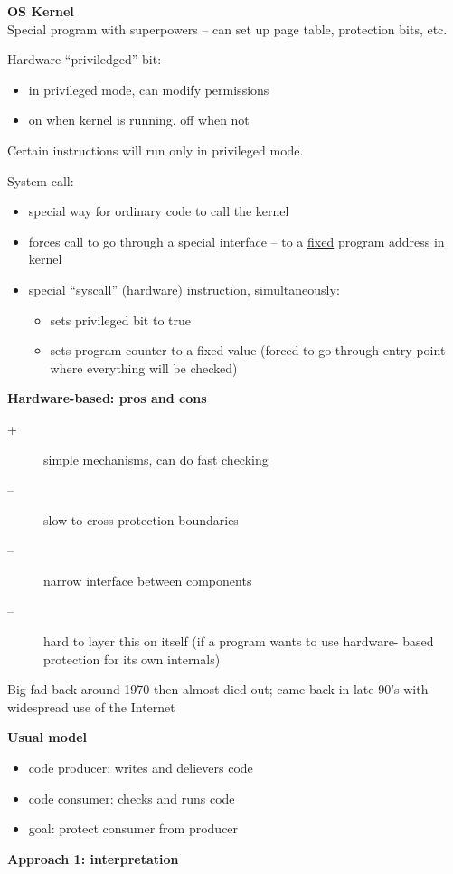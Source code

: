 
{\bf OS Kernel}\\
Special program with superpowers -- can set up page table, protection bits, etc.

Hardware ``priviledged'' bit:
\begin{itemize}
    \item in privileged mode, can modify permissions
    \item on when kernel is running, off when not
\end{itemize}
Certain instructions will run only in privileged mode.

System call:
\begin{itemize}
    \item special way for ordinary code to call the kernel
    \item forces call to go through a special interface -- to a
        \underline{fixed} program address in kernel
    \item special ``syscall'' (hardware) instruction, simultaneously:
        \begin{itemize}
            \item sets privileged bit to true
            \item sets program counter to a fixed value (forced to go through
                    entry point where everything will be checked)
        \end{itemize}
\end{itemize}

{\bf Hardware-based: pros and cons}
\begin{description}
    \item[+] simple mechanisms, can do fast checking
    \item[--] slow to cross protection boundaries
    \item[--] narrow interface between components
    \item[--] hard to layer this on itself (if a program wants to use hardware-
            based protection for its own internals)
\end{description}
Big fad back around 1970 then almost died out; came back in late 90's with
widespread use of the Internet

{\bf Usual model}
\begin{itemize}
    \item code producer: writes and delievers code
    \item code consumer: checks and runs code
    \item goal: protect consumer from producer
\end{itemize}
{\bf Approach 1: interpretation}

